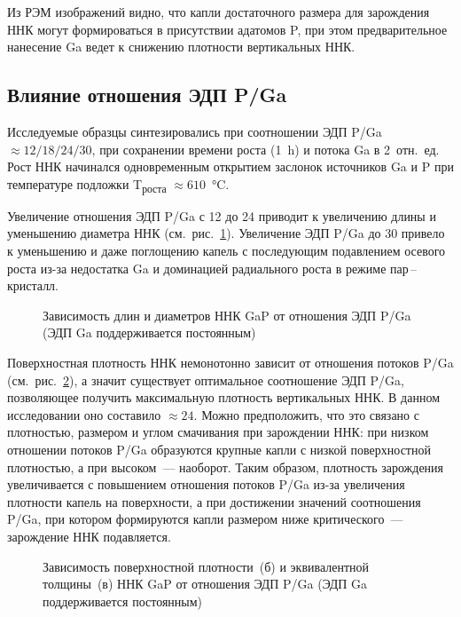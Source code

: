Из РЭМ изображений видно, что капли достаточного размера для зарождения ННК могут формироваться в присутствии адатомов P, при этом предварительное нанесение Ga ведет к снижению плотности вертикальных ННК.

\subsection{Влияние отношения ЭДП P/Ga}\label{subsec:ch6/sec2/sub2}

Исследуемые образцы синтезировались при соотношении ЭДП P/Ga \(\approx 12/18/24/30\), при сохранении времени роста (1~\si{\hour}) и потока Ga в 2~отн.~ед. Рост ННК начинался одновременным открытием заслонок источников Ga и P при температуре подложки T\textsubscript{роста} \(\approx 610\)~\si{\degreeCelsius}.

Увеличение отношения ЭДП P/Ga с 12 до 24 приводит к увеличению длины и уменьшению диаметра ННК (см.~рис.~\cref{fig:Image_41_1}). Увеличение ЭДП P/Ga до 30 привело к уменьшению и даже поглощению капель с последующим подавлением осевого роста из-за недостатка Ga и доминацией радиального роста в режиме пар\,--\,кристалл.

\begin{figure}[ht]
	\caption{Зависимость длин и диаметров ННК GaP от отношения ЭДП P/Ga (ЭДП Ga поддерживается постоянным)}\label{fig:Image_41_1}
\end{figure}

Поверхностная плотность ННК немонотонно зависит от отношения потоков P/Ga (см.~рис.~\cref{fig:Image_41_23}), а значит существует оптимальное соотношение ЭДП P/Ga, позволяющее получить максимальную плотность вертикальных ННК. В данном исследовании оно составило \(\approx 24\). Можно предположить, что это связано с плотностью, размером и углом смачивания при зарождении ННК: при низком отношении потоков P/Ga образуются крупные капли с низкой поверхностной плотностью, а при высоком~--- наоборот. Таким образом, плотность зарождения увеличивается с повышением отношения потоков P/Ga из-за увеличения плотности капель на поверхности, а при достижении значений соотношения P/Ga, при котором формируются капли размером ниже критического~--- зарождение ННК подавляется.

\begin{figure}[ht]
	\caption{Зависимость поверхностной плотности~(б) и эквивалентной толщины~(в) ННК GaP от отношения ЭДП P/Ga (ЭДП Ga поддерживается постоянным)}\label{fig:Image_41_23}
\end{figure}

